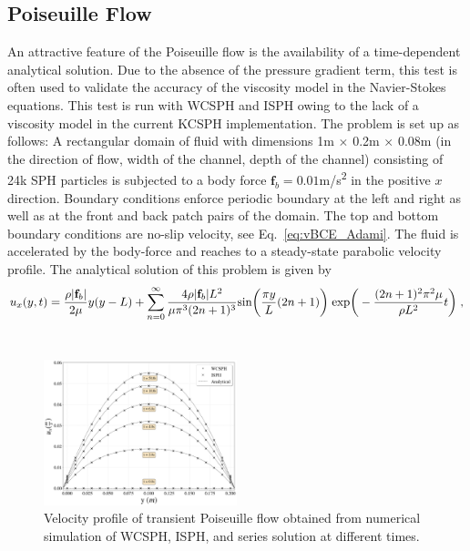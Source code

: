 \subsection{Poiseuille Flow}
An attractive feature of the Poiseuille flow is the availability of a time-dependent analytical solution. Due to the absence of the pressure gradient term, this test is often used to validate the accuracy of the viscosity model in the Navier-Stokes equations. This test is run with WCSPH and ISPH owing to the lack of a viscosity model in the current KCSPH implementation. The problem is set up as follows: A rectangular domain of fluid with dimensions 1\si{m} $\times$ 0.2\si{m} $\times$ 0.08\si{m} (in the direction of flow, width of the channel, depth of the channel) consisting of 24k SPH particles is subjected to a body force $\mathbf{f}_b=0.01$\si{m/s^2} in the positive $x$ direction. Boundary conditions enforce periodic boundary at the left and right as well as at the front and back patch pairs of the domain. The top and bottom boundary conditions are no-slip velocity, see Eq.~\ref{eq:vBCE_Adami}. The fluid is accelerated by the body-force and reaches to a steady-state parabolic velocity profile. The analytical solution of this problem is given by \cite{Morris1997}
\begin{align}\renewcommand{\arraystretch}{1.2}
u_x(y,t)=\frac{\rho |\mathbf{f}_b|}{2\mu} y(y-L) + \sum_{n=0}^{\infty} \frac{4\rho  |\mathbf{f}_b| L^2 }{\mu \pi^3 (2n+1)^3} \text{sin}\bigg(\frac{\pi y}{L} (2n+1)\bigg) \; \text{exp}\bigg(-\frac{(2n+1)^2\pi^2 \mu }{\rho L^2} t\bigg) \; ,
\end{align}\\

\begin{figure}[H]
	\begin{center}
		\includegraphics[width=0.5\textwidth]{images/SPH_Comparison/Figure_poiseuille_flow.png}
	\end{center}
	\caption{Velocity profile of transient Poiseuille flow obtained from numerical simulation of WCSPH, ISPH, and series solution at different times.}
	\label{fig:PoiseuilleFlow}
\end{figure}


